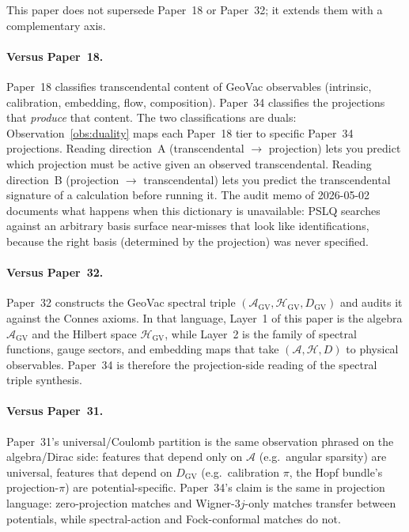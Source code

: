 \documentclass[11pt]{article}
\begin{document}
This paper does not supersede Paper~18 or Paper~32; it extends
them with a complementary axis.

\paragraph{Versus Paper~18.}  Paper~18 classifies transcendental
content of GeoVac observables (intrinsic, calibration, embedding,
flow, composition).  Paper~34 classifies the projections that
\emph{produce} that content.  The two classifications are
duals: Observation~\ref{obs:duality} maps each Paper~18 tier to
specific Paper~34 projections.  Reading direction~A
(transcendental $\to$ projection) lets you predict which projection
must be active given an observed transcendental.  Reading
direction~B (projection $\to$ transcendental) lets you predict the
transcendental signature of a calculation before running it.  The
audit memo of 2026-05-02 documents what happens when this dictionary
is unavailable: PSLQ searches against an arbitrary basis surface
near-misses that look like identifications, because the right basis
(determined by the projection) was never specified.

\paragraph{Versus Paper~32.}  Paper~32 constructs the GeoVac
spectral triple $(\mathcal{A}_{\text{GV}}, \mathcal{H}_{\text{GV}},
D_{\text{GV}})$ and audits it against the Connes axioms.  In that
language, Layer~1 of this paper is the algebra
$\mathcal{A}_{\text{GV}}$ and the Hilbert space
$\mathcal{H}_{\text{GV}}$, while Layer~2 is the family of
spectral functions, gauge sectors, and embedding maps that take
$(\mathcal{A}, \mathcal{H}, D)$ to physical observables.
Paper~34 is therefore the projection-side reading of the spectral
triple synthesis.

\paragraph{Versus Paper~31.}  Paper~31's universal/Coulomb
partition is the same observation phrased on the algebra/Dirac side:
features that depend only on $\mathcal{A}$ (e.g.\ angular sparsity)
are universal, features that depend on $D_{\text{GV}}$ (e.g.\
calibration $\pi$, the Hopf bundle's projection-$\pi$) are
potential-specific.  Paper~34's claim is the same in projection
language: zero-projection matches and Wigner-$3j$-only matches
transfer between potentials, while spectral-action and Fock-conformal
matches do not.
\end{document}
